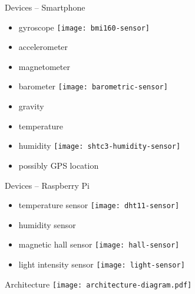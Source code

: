 \documentclass[aspectratio=169]{beamer}
\begin{document}
  \begin{frame}{Devices -- Smartphone}
    \begin{itemize}
      \item gyroscope
            \hspace*{2em}
            \texttt{[image: bmi160-sensor]}
      \item accelerometer
      \item magnetometer
      \item barometer
            \hspace*{2em}
            \texttt{[image: barometric-sensor]}
      \item gravity
      \item temperature
      \item humidity
            \hspace*{2em}
            \texttt{[image: shtc3-humidity-sensor]}
      \item possibly GPS location
    \end{itemize}
  \end{frame}

  \begin{frame}{Devices -- Raspberry Pi}
    \begin{itemize}
      \item temperature sensor
            \hspace*{2em}
            \texttt{[image: dht11-sensor]}
      \item humidity sensor
      \item magnetic hall sensor
            \hspace*{2em}
            \texttt{[image: hall-sensor]}
      \item light intensity sensor
            \hspace*{2em}
            \texttt{[image: light-sensor]}
    \end{itemize}
  \end{frame}

  

  

  \begin{frame}{Architecture}
    \centering
    \vfill
    \texttt{[image: architecture-diagram.pdf]}
  \end{frame}
\end{document}
